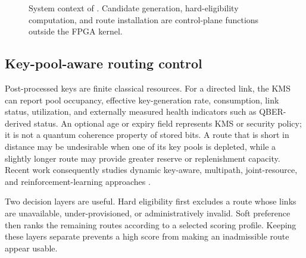\begin{figure}[H]
\centering
{}
\caption{System context of \QFlow. Candidate generation, hard-eligibility
computation, and route installation are control-plane functions outside the FPGA
kernel.}
\label{fig:system-context}
\end{figure}

\subsection{Key-pool-aware routing control}

Post-processed keys are finite classical resources. For a directed link, the KMS can
report pool occupancy, effective key-generation rate, consumption, link status,
utilization, and externally measured health indicators such as QBER-derived status.
An optional age or expiry field represents KMS or security policy; it is not a
quantum coherence property of stored bits. A route that is short in distance may be
undesirable when one of its key pools is depleted, while a slightly longer route may
provide greater reserve or replenishment capacity. Recent work consequently studies
dynamic key-aware, multipath, joint-resource, and reinforcement-learning approaches
\cite{bi2023dynamic,kiktenko2024nonoverlap,zhang2024rckta,hao2025qlearning,
johann2026adaptive}.

Two decision layers are useful. Hard eligibility first excludes a route whose links
are unavailable, under-provisioned, or administratively invalid. Soft preference
then ranks the remaining routes according to a selected scoring profile. Keeping
these layers separate prevents a high score from making an inadmissible route
appear usable.

